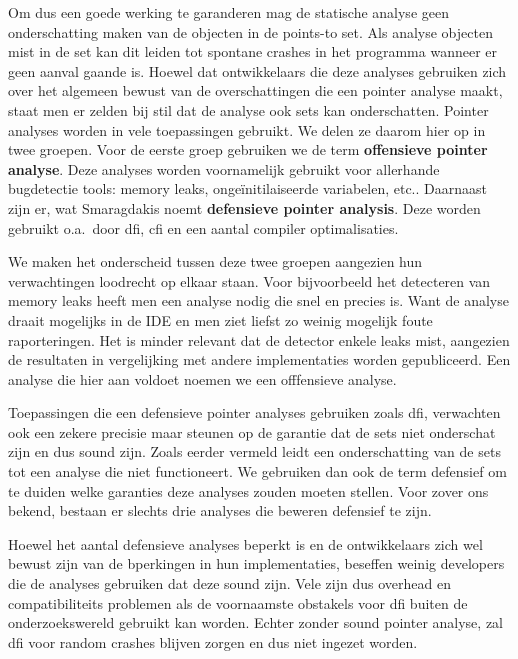 \documentclass[conference]{IEEEtran}
\begin{document}
Om dus een goede werking te garanderen mag de statische analyse geen onderschatting maken van de objecten in de points-to set. Als analyse objecten mist in de set kan 
dit leiden tot spontane crashes in het programma wanneer er geen aanval gaande is. Hoewel dat ontwikkelaars die deze analyses gebruiken zich over het algemeen bewust 
van de overschattingen die een pointer analyse maakt, staat men er zelden bij stil dat de analyse ook sets kan onderschatten.
Pointer analyses worden in vele toepassingen gebruikt. We delen ze daarom hier op in twee groepen. Voor de eerste groep gebruiken we de term \textbf{offensieve pointer analyse}.
Deze analyses worden voornamelijk gebruikt voor allerhande bugdetectie tools: memory leaks, ongeïnitilaiseerde variabelen, 
etc.\cite{sui_svf_nodate}\cite{cherem_practical_nodate}\cite{ye_accelerating_nodate}. Daarnaast zijn er, wat Smaragdakis\cite{smaragdakis_defensive_2018} noemt 
\textbf{defensieve pointer analysis}. Deze worden gebruikt o.a.\ door \gls{dfi}\cite{castro_securing_nodate}\cite{diez-franco_optimized_2024}, 
\gls{cfi}\cite{kasten_integrating_2024}\cite{li_finding_2020} en een aantal compiler optimalisaties\cite{hind_interprocedural_1999}. 

We maken het onderscheid tussen deze twee groepen aangezien hun verwachtingen loodrecht op elkaar staan. Voor bijvoorbeeld het detecteren van memory leaks heeft men 
een analyse nodig die snel en precies is\cite{cherem_practical_nodate}\cite{fan_smoke_2019}. Want de analyse draait mogelijks in de IDE en men ziet liefst zo weinig 
mogelijk foute raporteringen. Het is minder relevant dat de detector enkele leaks mist, aangezien de resultaten in vergelijking met andere implementaties worden gepubliceerd.
Een analyse die hier aan voldoet noemen we een offfensieve analyse.

Toepassingen die een defensieve pointer analyses gebruiken zoals \gls{dfi}, verwachten ook een zekere precisie maar steunen op de garantie dat de sets niet onderschat zijn en dus 
sound zijn. Zoals eerder vermeld leidt een onderschatting van de sets tot een analyse die niet functioneert. We gebruiken dan ook de term defensief om te duiden welke garanties deze 
analyses zouden moeten stellen. Voor zover ons bekend, bestaan er slechts drie analyses die beweren defensief te zijn.\cite{smaragdakis_defensive_2018}\cite{cai_unleashing_nodate}\cite{lu_practical_2023}

Hoewel het aantal defensieve analyses beperkt is en de ontwikkelaars zich wel bewust zijn van de bperkingen in hun implementaties\cite{vojnar_phasar_2019}, beseffen weinig 
developers die de analyses gebruiken dat deze sound zijn. Vele zijn dus overhead en compatibiliteits problemen als de voornaamste obstakels\cite{mathiasen_fine-grained_2021}\cite{bellec_rt-dfi_2022}\cite{diez-franco_optimized_2024}\cite{feng_toward_2022} 
voor \gls{dfi} buiten de onderzoekswereld gebruikt kan worden. Echter zonder sound pointer analyse, zal \gls{dfi} voor random crashes blijven zorgen en dus niet ingezet worden.
\end{document}
